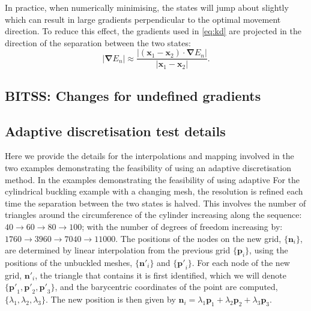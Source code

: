 \documentclass[twocolumn,10pt]{revtex4-2}
\newcommand{\abs}[1]{\left| #1 \right|}
\newcommand{\grad}{\bm{\nabla}}
\begin{document}
In practice, when numerically minimising, the states will jump about slightly which can result in large gradients perpendicular to the optimal movement direction.
To reduce this effect, the gradients used in \cref{eq:kd} are projected in the direction of the separation between the two states:
\begin{equation}
  \abs{\grad E_n} \approx \frac {\abs{(\bm{x}_1 - \bm{x}_2) \cdot \grad E_n}} {\abs{\bm{x}_1 - \bm{x}_2}}.
\end{equation}

\subsection{BITSS: Changes for undefined gradients}

\subsection{Adaptive discretisation test details}
Here we provide the details for the interpolations and mapping involved in the two examples demonstrating the feasibility of using an adaptive discretisation method.
In the examples demonstrating the feasibility of using adaptive 
For the cylindrical buckling example with a changing mesh, the resolution is refined each time the separation between the two states is halved. 
This involves the number of triangles around the circumference of the cylinder increasing along the sequence: $40 \rightarrow 60 \rightarrow 80 \rightarrow 100$; with the number of degrees of freedom increasing by: $1760 \rightarrow 3960 \rightarrow 7040 \rightarrow 11000$.
The positions of the nodes on the new grid, $\{\bm{n}_i\}$, are determined by linear interpolation from the previous grid $\{\bm{p}_i\}$, using the positions of the unbuckled meshes, $\{\bm{n'}_i\}$ and $\{\bm{p'}_i\}$.
For each node of the new grid, $\bm{n'}_i$, the triangle that contains it is first identified, which we will denote $\{\bm{p'}_1,\bm{p'}_2,\bm{p'}_3\}$, and the barycentric coordinates of the point are computed, $\{\lambda_1,\lambda_2,\lambda_3\}$.
The new position is then given by $\bm{n}_i = \lambda_1 \bm{p}_1 + \lambda_2 \bm{p}_2 + \lambda_3 \bm{p}_3$.
\end{document}
